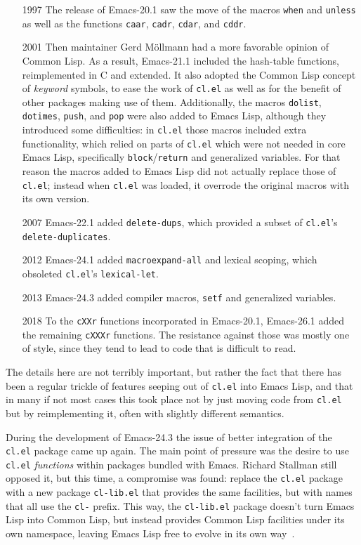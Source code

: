 \documentclass[format=acmsmall, review]{acmart}
\newcommand \Elisp {Emacs Lisp}
\begin{document}
\begin{itemize}
\item[1997] The release of Emacs-20.1 saw the move of the
  macros \texttt{when} and \texttt{unless} as well as the functions
  \texttt{caar}, \texttt{cadr}, \texttt{cdar}, and \texttt{cddr}.
\item[2001] Then maintainer Gerd Möllmann had a more favorable opinion of
  Common Lisp.  As a result, Emacs-21.1 included the hash-table functions,
  reimplemented in C and extended.  It also adopted the Common Lisp concept
  of \emph{keyword} symbols, to ease the work of \texttt{cl.el} as well as
  for the benefit of other packages making use of them.  Additionally, the
  macros \texttt{dolist}, \texttt{dotimes}, \texttt{push}, and \texttt{pop}
  were also added to \Elisp{}, although they introduced some difficulties: in
  \texttt{cl.el} those macros included extra functionality, which relied on
  parts of \texttt{cl.el} which were not needed in core \Elisp, specifically
  \texttt{block}/\texttt{return} and generalized variables.  For that reason
  the macros added to \Elisp{} did not actually replace those of
  \texttt{cl.el}; instead when \texttt{cl.el} was loaded, it overrode the
  original macros with its own version.
\item[2007] Emacs-22.1 added \texttt{delete-dups}, which provided a subset of
  \texttt{cl.el}'s \texttt{delete-duplicates}.
\item[2012] Emacs-24.1 added \texttt{macroexpand-all} and lexical scoping,
  which obsoleted \texttt{cl.el}'s \texttt{lexical-let}.
\item[2013] Emacs-24.3 added compiler macros, \texttt{setf} and
  generalized variables.
\item[2018] To the \texttt{cXXr} functions incorporated in Emacs-20.1,
  Emacs-26.1 added the remaining \texttt{cXXXr} functions.  The resistance
  against those was mostly one of style, since they tend to lead to code
  that is difficult to read.
\end{itemize}
The details here are not terribly important, but rather the fact that there
has been a regular trickle of features seeping out of \texttt{cl.el} into
\Elisp{}, and that in many if not most cases this took place not by just
moving code from \texttt{cl.el} but by reimplementing it, often with
slightly different semantics.

During the development of Emacs-24.3 the issue of better integration of the
\texttt{cl.el} package came up again.  The main point of pressure was the
desire to use \texttt{cl.el} \emph{functions} within packages bundled with
Emacs.  Richard Stallman still opposed it, but this time, a compromise was
found: replace the \texttt{cl.el} package with a new package
\texttt{cl-lib.el} that provides the same facilities, but with names that
all use the \texttt{cl-} prefix.  This way, the \texttt{cl-lib.el} package
doesn't turn \Elisp{} into Common Lisp, but instead provides Common Lisp
facilities under its own namespace, leaving \Elisp{} free to evolve in its
own way~\cite{RMS-cl-real}.
\end{document}
